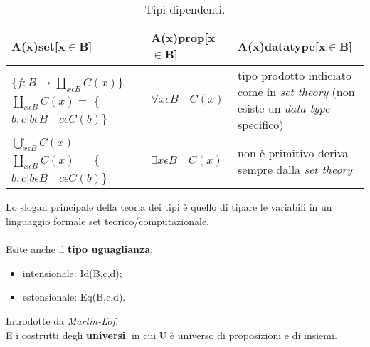 \begin{table}[H]
\centering
\begin{tabularx}{\textwidth}{p{3.8cm}XX}
\hline 
\rowcolor{orange}
{\color[HTML]{FFFFFF}\textbf{A(x)set[x$\in$B]}} & {\color[HTML]{FFFFFF} \textbf{A(x)prop[x$\in$B]}} & {\color[HTML]{FFFFFF}\textbf{A(x)datatype[x$\in$B]}}\\
\hline\hline
\centering \scriptsize{\{$\displaystyle f: B \rightarrow \displaystyle\coprod\limits_{x \epsilon B} C(x)$\}} \scriptsize{$\displaystyle\coprod\limits_{x \epsilon B} C(x) =$ \{$b,c | b\epsilon B \quad c\epsilon C(b)$\}}& \centering \small{$\displaystyle \forall {x \epsilon B} \quad C(x)$} & tipo prodotto indiciato come in \textit{set theory} (non esiste un \textit{data-type} specifico)\\
\hline
\centering \scriptsize{$\displaystyle\bigcup\limits_{x \epsilon B}^. C(x)$} \qquad \qquad \qquad \scriptsize{$\displaystyle\coprod\limits_{x \epsilon B} C(x) =$ \{$b,c | b\epsilon B \quad c\epsilon C(b)$\}} & \centering \small{$\displaystyle \exists{x \epsilon B} \quad C(x)$} & non \`e primitivo deriva sempre dalla \textit{set theory}\\
\end{tabularx}
\caption{\label{tab:tipi-dipendenti}Tipi dipendenti.} 
\end{table}
\noindent
Lo slogan principale della teoria dei tipi \`e quello di tipare le variabili in un linguaggio formale set teorico/computazionale.\\\\
Esite anche il \textbf{tipo uguaglianza}:
\begin{itemize}
\item intensionale: Id(B,c,d);
\item estensionale: Eq(B,c,d).
\end{itemize}
\noindent
Introdotte da \textit{Martin-L$\ddot{o}$f}.\\
E i costrutti degli \textbf{universi}, in cui U \`e universo di proposizioni e di insiemi.
